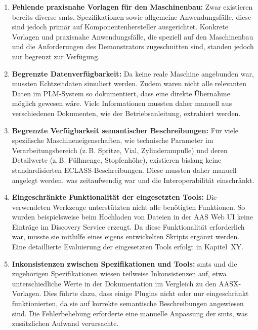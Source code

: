 \begin{enumerate}
    \item \textbf{Fehlende praxisnahe Vorlagen für den Maschinenbau:}  
    Zwar existieren bereits diverse \acsp{smt}, Spezifikationen sowie allgemeine Anwendungsfälle, diese sind jedoch primär auf Komponentenhersteller ausgerichtet.  
    Konkrete Vorlagen und praxisnahe Anwendungsfälle, die speziell auf den Maschinenbau und die Anforderungen des Demonstrators zugeschnitten sind, standen jedoch nur begrenzt zur Verfügung.

    \item \textbf{Begrenzte Datenverfügbarkeit:}  
    Da keine reale Maschine angebunden war, mussten Echtzeitdaten simuliert werden.  
    Zudem waren nicht alle relevanten Daten im PLM-System so dokumentiert, dass eine direkte Übernahme möglich gewesen wäre.  
    Viele Informationen mussten daher manuell aus verschiedenen Dokumenten, wie der Betriebsanleitung, extrahiert werden.  

    \item \textbf{Begrenzte Verfügbarkeit semantischer Beschreibungen:}  
    Für viele spezifische Maschineneigenschaften, wie technische Parameter im Verarbeitungsbereich (z.\,B. Spritze, Vial, Zylinderampulle) und deren Detailwerte (z.\,B. Füllmenge, Stopfenhöhe), existieren bislang keine standardisierten ECLASS-Beschreibungen.  
    Diese mussten daher manuell angelegt werden, was zeitaufwendig war und die Interoperabilität einschränkt.

    \item \textbf{Eingeschränkte Funktionalität der eingesetzten Tools:}  
    Die verwendeten Werkzeuge unterstützten nicht alle benötigten Funktionen.  
    So wurden beispielsweise beim Hochladen von Dateien in der AAS Web UI keine Einträge im Discovery Service erzeugt.  
    Da diese Funktionalität erforderlich war, musste sie mithilfe eines eigens entwickelten Skripts ergänzt werden.  
    Eine detaillierte Evaluierung der eingesetzten Tools erfolgt in Kapitel~XY.

    \item \textbf{Inkonsistenzen zwischen Spezifikationen und Tools:}  
    \acsp{smt} und die zugehörigen Spezifikationen wiesen teilweise Inkonsistenzen auf, etwa unterschiedliche Werte in der Dokumentation im Vergleich zu den AASX-Vorlagen.  
    Dies führte dazu, dass einige Plugins nicht oder nur eingeschränkt funktionierten, da sie auf korrekte semantische Beschreibungen angewiesen sind.  
    Die Fehlerbehebung erforderte eine manuelle Anpassung der \acsp{smt}, was zusätzlichen Aufwand verursachte.
\end{enumerate}

